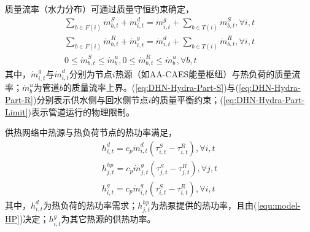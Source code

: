 质量流率（水力分布）可通过质量守恒约束确定\cite{LXZ-DHN-2016, DHN-Model-17}，
\begin{subequations}
\label{eq:DHN-Hydra-Part}
\begin{gather}
\sum\limits_{b \in F(i)} {\dot m_{b,t}^S}  + \dot m_{i,t}^d = \dot m_{i,t}^g + \sum\limits_{b \in T(i)} {\dot m_{b,t}^S} ,\forall i,t \label{eq:DHN-Hydra-Part-S}\\
\sum\limits_{b \in F(i)} {\dot m_{b,t}^R}  + \dot m_{i,t}^g = \dot m_{i,t}^d + \sum\limits_{b \in T(i)} {\dot m_{b,t}^R} ,\forall i,t \label{eq:DHN-Hydra-Part-R}\\
0 \le \dot m_{b,t}^S \le \dot m_b^u,0 \le \dot m_{b,t}^R \le \dot m_b^u,\forall b,t\label{eq:DHN-Hydra-Part-Limit}
\end{gather}
\end{subequations}
其中，$\dot m_{i,t}^g$与$\dot m_{i,t}^d$分别为节点$i$热源（如AA-CAES能量枢纽）与热负荷的质量流率；$\dot m_b^u$为管道$b$的质量流率上界。(\ref{eq:DHN-Hydra-Part-S})与(\ref{eq:DHN-Hydra-Part-R})分别表示供水侧与回水侧节点$i$的质量平衡约束；(\ref{eq:DHN-Hydra-Part-Limit})表示管道运行的物理限制。

供热网络中热源与热负荷节点的热功率满足，
\begin{subequations}
\label{eq:DHN-heat-power-model}
\begin{gather}
h_{i,t}^{d} = c_p \dot m_{i,t}^d  (\tau_{i,t}^S - \tau_{i,t}^R), \forall i,t \\
h_{j,t}^{hp} = c_p \dot m_{j,t}^g  (\tau_{j,t}^S - \tau_{j,t}^R), \forall j,t \\
h_{i,t}^{g} = c_p \dot m_{i,t}^g  (\tau_{i,t}^S - \tau_{i,t}^R), \forall i,t
\end{gather}
\end{subequations}
其中，$h_{i,t}^d$为热负荷的热功率需求；$h_{j,t}^{hp}$为热泵提供的热功率，且由(\ref{equ:model-HP})决定；$h_{i,t}^g$为其它热源的供热功率。

